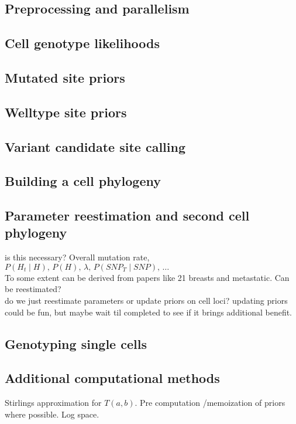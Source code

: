 \documentclass[../main.tex]{subfiles}
\begin{document}


\subsection{Preprocessing and parallelism}


\subsection{Cell genotype likelihoods}


\subsection{Mutated site priors}


\subsection{Welltype site priors}


\subsection{Variant candidate site calling}


\subsection{Building a cell phylogeny}


\subsection{Parameter reestimation and second cell phylogeny}
is this necessary? Overall mutation rate, $P(H_t\mid H),\,P(H),\,\lambda,\,P(SNP_T\mid SNP),\,\dots$\\
To some extent can be derived from papers like 21 breasts and metastatic. Can be reestimated?\\
do we just reestimate parameters or update priors on cell loci? updating priors could be fun, but maybe wait til completed to see if it brings additional benefit.\\

\subsection{Genotyping single cells}



\subsection{Additional computational methods}
Stirlings approximation for $T(a,b)$. Pre computation /memoization of priors where possible. Log space.
\end{document}
